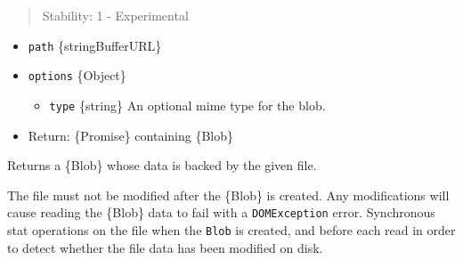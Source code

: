 \begin{quote}
Stability: 1 - Experimental
\end{quote}

\begin{itemize}
\tightlist
\item
  \texttt{path} \{string\textbar Buffer\textbar URL\}
\item
  \texttt{options} \{Object\}

  \begin{itemize}
  \tightlist
  \item
    \texttt{type} \{string\} An optional mime type for the blob.
  \end{itemize}
\item
  Return: \{Promise\} containing \{Blob\}
\end{itemize}

Returns a \{Blob\} whose data is backed by the given file.

The file must not be modified after the \{Blob\} is created. Any
modifications will cause reading the \{Blob\} data to fail with a
\texttt{DOMException} error. Synchronous stat operations on the file
when the \texttt{Blob} is created, and before each read in order to
detect whether the file data has been modified on disk.

\begin{Shaded}
\begin{Highlighting}[]
 \OperatorTok{;}

\OperatorTok{=}  \NormalTok{(}\NormalTok{)}\OperatorTok{;}
\OperatorTok{=} \NormalTok{()}\OperatorTok{;}
\NormalTok{()}\OperatorTok{;}
\end{Highlighting}
\end{Shaded}

\begin{Shaded}
\begin{Highlighting}[]
\OperatorTok{=} \NormalTok{(}\NormalTok{)}\OperatorTok{;}

\NormalTok{(}\NormalTok{ () }\KeywordTok{=\textgreater{}}\NormalTok{ \{}
  \OperatorTok{=}  \NormalTok{(}\NormalTok{)}\OperatorTok{;}
  \OperatorTok{=} \NormalTok{()}\OperatorTok{;}
\NormalTok{()}\OperatorTok{;}
\NormalTok{\})()}\OperatorTok{;}
\end{Highlighting}
\end{Shaded}

